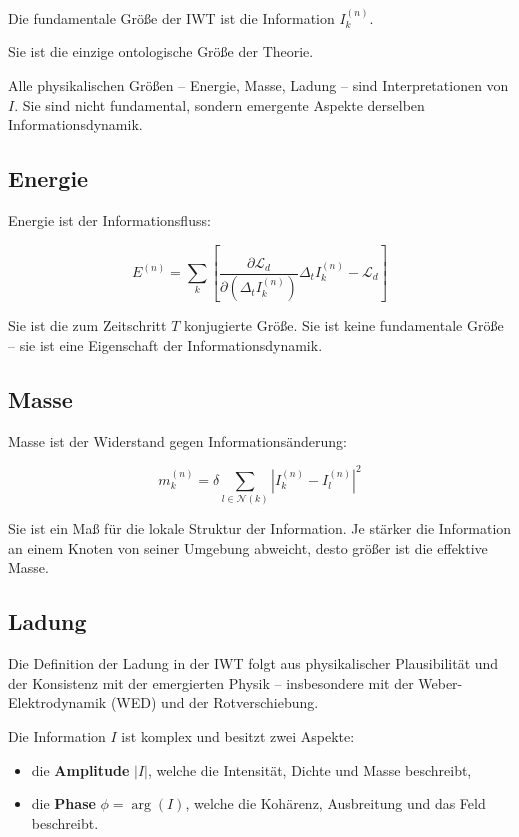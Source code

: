 Die fundamentale Größe der IWT ist die Information \( I_k^{(n)} \).

Sie ist die einzige ontologische Größe der Theorie.

Alle physikalischen Größen – Energie, Masse, Ladung – sind Interpretationen von \( I \). Sie sind nicht fundamental, sondern emergente Aspekte derselben Informationsdynamik.

\subsection{Energie}

Energie ist der Informationsfluss:

\[
E^{(n)} = \sum_k \left[ \frac{\partial \mathcal{L}_d}{\partial (\Delta_t I_k^{(n)})} \Delta_t I_k^{(n)} - \mathcal{L}_d \right]
\]

Sie ist die zum Zeitschritt \( T \) konjugierte Größe. Sie ist keine fundamentale Größe – sie ist eine Eigenschaft der Informationsdynamik.

\subsection{Masse}

Masse ist der Widerstand gegen Informationsänderung:

\[
m_k^{(n)} = \delta \sum_{l \in \mathcal{N}(k)} |I_k^{(n)} - I_l^{(n)}|^2
\]

Sie ist ein Maß für die lokale Struktur der Information. Je stärker die Information an einem Knoten von seiner Umgebung abweicht, desto größer ist die effektive Masse.

\subsection{Ladung}

Die Definition der Ladung in der IWT folgt aus physikalischer Plausibilität und der Konsistenz mit der emergierten Physik – insbesondere mit der Weber-Elektrodynamik (WED) und der Rotverschiebung.

Die Information \( I \) ist komplex und besitzt zwei Aspekte:
\begin{itemize}
\item die \textbf{Amplitude} \( |I| \), welche die Intensität, Dichte und Masse beschreibt,
\item die \textbf{Phase} \( \phi = \arg(I) \), welche die Kohärenz, Ausbreitung und das Feld beschreibt.
\end{itemize}

